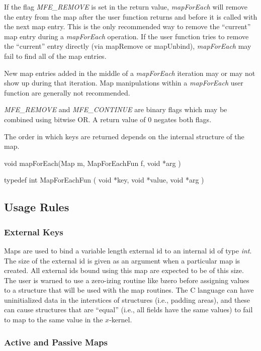 If the flag {\em MFE\_REMOVE} is set in the return value, {\em mapForEach}
will remove the entry from the map after the user function returns and
before it is called with the next map entry.  This is the only
recommended way to remove the ``current'' map entry during a
{\em mapForEach} operation.  If the user function tries to remove the
``current'' entry directly (via mapRemove or mapUnbind), {\em mapForEach}
may fail to find all of the map entries.

New map entries added in the middle of a {\em mapForEach} iteration may or
may not show up during that iteration.  Map manipulations within a
{\em mapForEach} user function are generally not recommended.

{\em MFE\_REMOVE} and {\em MFE\_CONTINUE} are binary flags which may
be combined using bitwise OR.  A return value of 0 negates both flags.

The order in which keys are returned depends on the
internal structure of the map.

\medskip

{\sem void} {\bold mapForEach}({\sem Map} {\caps m}, {\sem MapForEachFun} {\caps f}, {\sem void} *{\caps arg} )
\medskip

{\sem typedef int} {\bold MapForEachFun}
(
{\sem void} *{\caps key}, 
{\sem void} *{\caps value}, 
{\sem void} *{\caps arg} 
)


\subsection{Usage Rules}

\subsubsection{External Keys}

Maps are used to bind a variable length external id to an internal id
of type {\em int}.  The size of the external id is given
as an argument when a particular map is created. All external ids
bound using this map are expected to be of this size.  The user is
warned to use a zero-izing routine like {\sanss bzero} before
assigning values to a structure that will be used with the map
routines.  The C language can have uninitialized data in the
interstices of structures (i.e., padding areas), and these can cause
structures that are ``equal'' (i.e., all fields have the same values)
to fail to map to the same value in the $x$-kernel.


\subsubsection{Active and Passive Maps}

